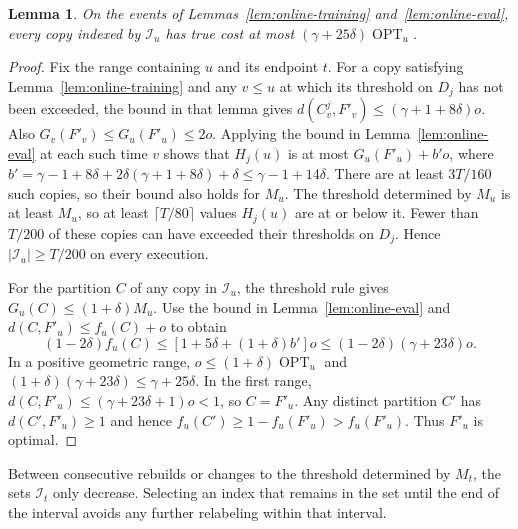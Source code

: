 \documentclass[11pt]{article}
\newtheorem{lemma}[theorem]{Lemma}
\newcommand{\OPT}{\operatorname{OPT}}
\begin{document}
\begin{lemma}\label{lem:online-eligible}
On the events of Lemmas~\ref{lem:online-training} and~\ref{lem:online-eval},
every copy indexed by $\mathcal I_u$ has true cost at most
$(\gamma+25\delta)\OPT_u$.
\end{lemma}
\begin{proof}
Fix the range containing $u$ and its endpoint $t$. For a copy satisfying
Lemma~\ref{lem:online-training} and any $v\le u$ at which its threshold on $D_j$ has not
been exceeded, the bound in that lemma gives
$d(C^j_v,F'_v)\le(\gamma+1+8\delta)o$. Also
$G_v(F'_v)\le G_u(F'_u)\le2o$. Applying the bound in Lemma~\ref{lem:online-eval}
at each such time $v$ shows that $H_j(u)$ is at most
$G_u(F'_u)+b'o$, where
$b'=\gamma-1+8\delta+2\delta(\gamma+1+8\delta)+\delta
\le\gamma-1+14\delta$.
There are at least $3T/160$ such copies, so their bound also
holds for $M_u$. The threshold determined by $M_u$ is at least $M_u$, so at least $\lceil T/80\rceil$
values $H_j(u)$ are at or below it. Fewer than $T/200$ of these copies can
have exceeded their thresholds on $D_j$. Hence $|\mathcal I_u|\ge T/200$
on every execution.

For the partition $C$ of any copy in $\mathcal I_u$, the threshold rule gives $G_u(C)\le(1+\delta)M_u$.
Use the bound in Lemma~\ref{lem:online-eval} and $d(C,F'_u)\le f_u(C)+o$ to obtain
\[
 (1-2\delta)f_u(C)
 \le [1+5\delta+(1+\delta)b']o
 \le(1-2\delta)(\gamma+23\delta)o.
\]
In a positive geometric range, $o\le(1+\delta)\OPT_u$ and
$(1+\delta)(\gamma+23\delta)\le\gamma+25\delta$. In the first
range, $d(C,F'_u)\le(\gamma+23\delta+1)o<1$, so $C=F'_u$.
Any distinct partition $C'$ has $d(C',F'_u)\ge1$ and hence
$f_u(C')\ge1-f_u(F'_u)>f_u(F'_u)$. Thus $F'_u$ is optimal.
\end{proof}

Between consecutive rebuilds or changes to the threshold determined by
$M_t$, the sets $\mathcal I_t$ only decrease. Selecting an index that
remains in the set until the end of the interval avoids any further
relabeling within that interval.
\end{document}
